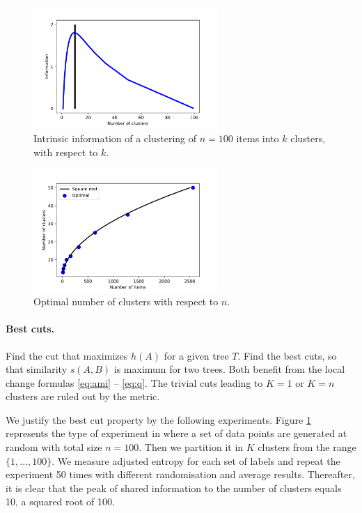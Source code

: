 \begin{figure}[h]
	\begin{center}
		\includegraphics[width=7cm]{figures/info-100.pdf}
		\caption{Intrinsic information of a clustering of $n=100$ items into $k$ clusters, with respect to $k$.}
		\label{intrinsic_information}
	\end{center}
\end{figure}


\begin{figure}[h]
	\begin{center}
		\includegraphics[width=7cm]{figures/sqrt.pdf}
		\caption{Optimal number of clusters with respect to  $n$.}
		\label{optimal_n_clusters}
	\end{center}
\end{figure}



\paragraph{Best cuts.}


Find the cut that maximizes $h(A)$ for a given tree $T$. Find the best cuts, so that similarity $s(A,B)$ is maximum for two trees. Both benefit from the local change formulas \ref{eq:ami} -- \ref{eq:q}. The trivial cuts leading to $K=1$ or $K=n$ clusters are ruled out by the metric.

We justify the best cut property by the following experiments. 
Figure \ref{intrinsic_information} represents the type of experiment in where a set of data points are generated at random with total size $n=100$. Then we partition it in $K$ clusters from the range $\{1,\ldots,100\}$. We measure adjusted entropy for each set of labels and repeat the experiment 50 times with different randomisation and average results. Thereafter, it is clear that the peak of shared information to the number of clusters equals 10, a squared root of 100.   

